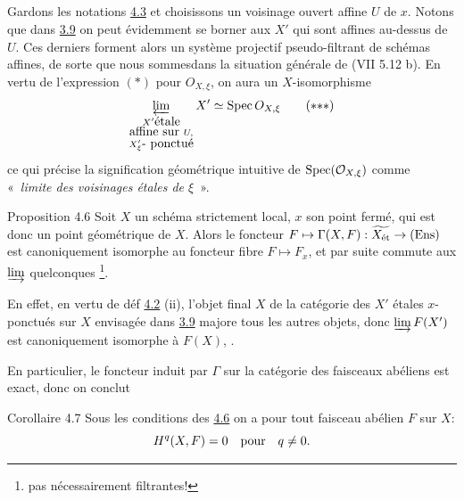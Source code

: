 \documentclass[10pt]{../fichiers-configuration-latex/smfart}
\begin{document}
\subsection{}

Gardons les notations  \hyperref[VIII.def4.3]{4.3} et choisissons un voisinage ouvert
affine $U$ de $x$. Notons que dans \hyperref[VIII.prop3.9]{3.9}
on peut évidemment se borner
aux $X'$ qui sont affines au-dessus de $U$. Ces derniers forment alors
un système projectif pseudo-filtrant de schémas affines, de sorte que
nous sommes\pageoriginale dans la situation générale de 
(\cf  VII 5.12 b). %
En vertu de l'expression $(\ast)$ pour $O_{X, \xi}$, on aura un
$X$-isomorphisme
\begin{equation*}
\varprojlim_{\substack{X' \mbox{\rm étale}\\ \mbox{affine sur } U,\\
X'_{\xi}\mbox{\rm - ponctué}}} X'\simeq \Spec O_{X, \xi}\tag{${\ast}{\ast}{\ast}$}
\end{equation*}
ce qui précise la signification géométrique intuitive de
$\operatorname{Spec}({\mathcal O}_{X, \xi})$ comme « \emph{limite des voisinages étales
de $\xi$} ».

\begin{enonce*}{Proposition 4.6}
Soit $X$ un schéma strictement local, $x$ son point fermé, qui est
donc un point géométrique de $X$. Alors le foncteur $F \mapsto
\Gamma (X, F): \widetilde{X_{\text{\rm ét}}} \to (\Ens)$ est
canoniquement isomorphe au foncteur fibre $F \mapsto F_x$, et par
suite commute aux $\varinjlim$ quelconques \footnote{pas
nécessairement filtrantes!}.
\end{enonce*}

En effet, en vertu de déf \hyperref[VIII.def4.2]{4.2} (ii), l'objet final $X$ de la catégorie
des $X'$ étales $x$-ponctués sur $X$ envisagée dans \hyperref[VIII.prop3.9]{3.9}
majore tous
les autres objets, donc $\varinjlim F(X')$ est canoniquement isomorphe
à $F(X)$, \cqfd.

En particulier, le foncteur induit par $\Gamma$ sur la catégorie des
faisceaux abéliens est exact, donc on conclut

\begin{enonce*}{Corollaire 4.7}
Sous les conditions des \hyperref[VIII.prop4.6]{4.6}
on a pour tout faisceau abélien $F$ sur
$X$:
$$
H^q (X, F) = 0\quad \mbox{\rm pour}\quad q \neq 0{}.
$$
\end{enonce*}
\end{document}
